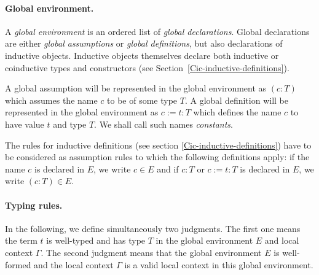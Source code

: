 \paragraph[Global environment.]{Global environment.}

A {\em global environment} is an ordered list of {\em global declarations}.
Global declarations are either {\em global assumptions} or {\em global
definitions}, but also declarations of inductive objects. Inductive objects themselves declare both inductive or coinductive types and constructors
(see Section~\ref{Cic-inductive-definitions}).

A global assumption will be represented in the global environment as
$(c:T)$ which assumes the name $c$ to be of some type $T$.
A global definition will
be represented in the global environment as $c:=t:T$ which defines
the name $c$ to have value $t$ and type $T$.
We shall call such names {\em constants}.

The rules for inductive definitions (see section
\ref{Cic-inductive-definitions}) have to be considered as assumption
rules to which the following definitions apply: if the name $c$ is
declared in $E$, we write $c \in E$ and if $c:T$ or $c:=t:T$ is
declared in $E$, we write $(c : T) \in E$.

\paragraph[Typing rules.]{Typing rules.\label{Typing-rules}}
In the following, we define simultaneously two
judgments.  The first one  means the term $t$ is well-typed
and has type $T$ in the global environment $E$ and local context $\Gamma$.  The
second judgment \WFE{\Gamma} means that the global environment $E$ is
well-formed and the local context $\Gamma$ is a valid local context in this
global environment.
%

